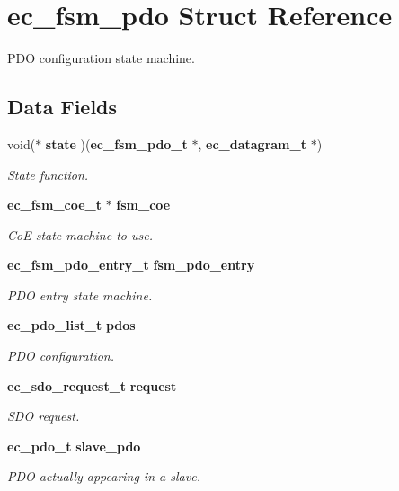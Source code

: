 \section{ec\-\_\-fsm\-\_\-pdo Struct Reference}
\label{structec__fsm__pdo}


P\-D\-O configuration state machine.  


\subsection*{Data Fields}
\begin{DoxyCompactItemize}
\item 
void($\ast$ {\bf state} )({\bf ec\-\_\-fsm\-\_\-pdo\-\_\-t} $\ast$, {\bf ec\-\_\-datagram\-\_\-t} $\ast$)
\begin{DoxyCompactList}\small\item\em State function. \end{DoxyCompactList}\item 
{\bf ec\-\_\-fsm\-\_\-coe\-\_\-t} $\ast$ {\bf fsm\-\_\-coe}
\begin{DoxyCompactList}\small\item\em Co\-E state machine to use. \end{DoxyCompactList}\item 
{\bf ec\-\_\-fsm\-\_\-pdo\-\_\-entry\-\_\-t} {\bf fsm\-\_\-pdo\-\_\-entry}
\begin{DoxyCompactList}\small\item\em P\-D\-O entry state machine. \end{DoxyCompactList}\item 
{\bf ec\-\_\-pdo\-\_\-list\-\_\-t} {\bf pdos}
\begin{DoxyCompactList}\small\item\em P\-D\-O configuration. \end{DoxyCompactList}\item 
{\bf ec\-\_\-sdo\-\_\-request\-\_\-t} {\bf request}
\begin{DoxyCompactList}\small\item\em S\-D\-O request. \end{DoxyCompactList}\item 
{\bf ec\-\_\-pdo\-\_\-t} {\bf slave\-\_\-pdo}
\begin{DoxyCompactList}\small\item\em P\-D\-O actually appearing in a slave. \end{DoxyCompactList}\item 

\end{DoxyCompactItemize}
